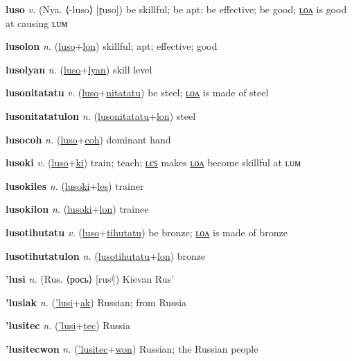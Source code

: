 \textbf{\hypertarget{luso}{luso}} \textit{v.} (Nya. ⟨-luso⟩ [ɽuso])
be skillful; be apt; be effective; be good; \hyperlink{lusolon}{ʟᴏᴧ} is good at causing ʟᴜᴍ

\textbf{\hypertarget{lusolon}{lusolon}} \textit{n.} (\hyperlink{luso}{luso}+\allowbreak \hyperlink{lon}{lon})
skillful; apt; effective; good

\textbf{\hypertarget{lusolyan}{lusolyan}} \textit{n.} (\hyperlink{luso}{luso}+\allowbreak \hyperlink{lyan}{lyan})
skill level

\textbf{\hypertarget{lusonitatatu}{lusonitatatu}} \textit{v.} (\hyperlink{luso}{luso}+\allowbreak \hyperlink{nitatatu}{nitatatu})
be steel; \hyperlink{lusonitatatulon}{ʟᴏᴧ} is made of steel

\textbf{\hypertarget{lusonitatatulon}{lusonitatatulon}} \textit{n.} (\hyperlink{lusonitatatu}{lusonitatatu}+\allowbreak \hyperlink{lon}{lon})
steel

\textbf{\hypertarget{lusocoh}{lusocoh}} \textit{n.} (\hyperlink{luso}{luso}+\allowbreak \hyperlink{coh}{coh})
dominant hand

\textbf{\hypertarget{lusoki}{lusoki}} \textit{v.} (\hyperlink{luso}{luso}+\allowbreak \hyperlink{ki}{ki})
train; teach; \hyperlink{lusokiles}{ʟєꜱ} makes \hyperlink{lusokilon}{ʟᴏᴧ} become skillful at ʟᴜᴍ

\textbf{\hypertarget{lusokiles}{lusokiles}} \textit{n.} (\hyperlink{lusoki}{lusoki}+\allowbreak \hyperlink{les}{les})
trainer

\textbf{\hypertarget{lusokilon}{lusokilon}} \textit{n.} (\hyperlink{lusoki}{lusoki}+\allowbreak \hyperlink{lon}{lon})
trainee

\textbf{\hypertarget{lusotihutatu}{lusotihutatu}} \textit{v.} (\hyperlink{luso}{luso}+\allowbreak \hyperlink{tihutatu}{tihutatu})
be bronze; \hyperlink{lusotihutatulon}{ʟᴏᴧ} is made of bronze

\textbf{\hypertarget{lusotihutatulon}{lusotihutatulon}} \textit{n.} (\hyperlink{lusotihutatu}{lusotihutatu}+\allowbreak \hyperlink{lon}{lon})
bronze

\textbf{\hypertarget{'lusi}{'lusi}} \textit{n.} (Rus. ⟨рось⟩ [rusʲ])
Kievan Rus’

\textbf{\hypertarget{'lusiak}{'lusiak}} \textit{n.} (\hyperlink{'lusi}{'lusi}+\allowbreak \hyperlink{ak}{ak})
Russian; from Russia

\textbf{\hypertarget{'lusitec}{'lusitec}} \textit{n.} (\hyperlink{'lusi}{'lusi}+\allowbreak \hyperlink{tec}{tec})
Russia

\textbf{\hypertarget{'lusitecwon}{'lusitecwon}} \textit{n.} (\hyperlink{'lusitec}{'lusitec}+\allowbreak \hyperlink{won}{won})
Russian; the Russian people


